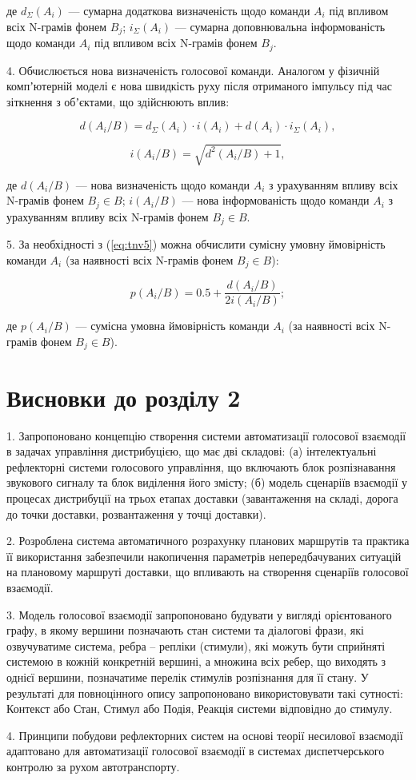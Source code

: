 \noindent
де $d_\Sigma(A_i)$ --- сумарна додаткова визначеність щодо команди $A_i$ під впливом всіх N-грамів фонем $B_j$; $i_\Sigma(A_i)$ --- сумарна доповнювальна інформованість щодо команди $A_i$ під впливом всіх N-грамів фонем $B_j$.

4. Обчислюється нова визначеність голосової команди. Аналогом у фізичній компʼютерній моделі є нова швидкість руху після отриманого імпульсу під час зіткнення з обʼєктами, що здійснюють вплив:

\begin{equation}
\label{eq:ifron2}
d(A_i/B)=d_\Sigma(A_i)\cdot i(A_i)+d(A_i)\cdot i_\Sigma(A_i),
\end{equation}


\[
i(A_i/B) = \sqrt{d^2(A_i/B)+1},
\]

\noindent
де $d(A_i/B)$ --- нова визначеність щодо команди $A_i$ з урахуванням впливу всіх N-грамів фонем $B_j \in B$; $i(A_i/B)$ --- нова інформованість щодо команди $A_i$ з урахуванням впливу всіх N-грамів фонем $B_j \in B$.

5. За необхідності з (\ref{eq:tnv5}) можна обчислити сумісну умовну ймовірність команди $A_i$ (за наявності всіх N-грамів фонем $B_j \in B$):

\[
p(A_i/B)=0.5+\frac{d(A_i/B)}{2i(A_i/B)};
\]

\noindent
де $p(A_i/B)$ --- сумісна умовна ймовірність команди $A_i$ (за наявності всіх N-грамів фонем $B_j \in B$).

\section*{Висновки до розділу 2}

1. Запропоновано концепцію створення системи автоматизації голосової взаємодії в задачах управління дистрибуцією, що має дві складові: (а) інтелектуальні рефлекторні системи голосового управління, що включають блок розпізнавання звукового сигналу та блок виділення його змісту; (б) модель сценаріїв взаємодії у процесах дистрибуції на трьох етапах доставки (завантаження на складі, дорога до точки доставки, розвантаження у точці доставки).

2. Розроблена система автоматичного розрахунку планових маршрутів та практика її використання забезпечили накопичення параметрів непередбачуваних ситуацій на плановому маршруті доставки, що впливають на створення сценаріїв голосової взаємодії.

3. Модель голосової взаємодії запропоновано будувати у вигляді орієнтованого графу, в якому вершини позначають стан системи та діалогові фрази, які озвучуватиме система, ребра – репліки (стимули), які можуть бути сприйняті системою в кожній конкретній вершині, а множина всіх ребер, що виходять з однієї вершини, позначатиме перелік стимулів розпізнання для її стану. У результаті для повноцінного опису запропоновано використовувати такі сутності: Контекст або Стан, Стимул або Подія, Реакція системи відповідно до стимулу.

4. Принципи побудови рефлекторних систем на основі теорії несилової взаємодії адаптовано для автоматизації голосової взаємодії в системах диспетчерського контролю за рухом автотранспорту.
